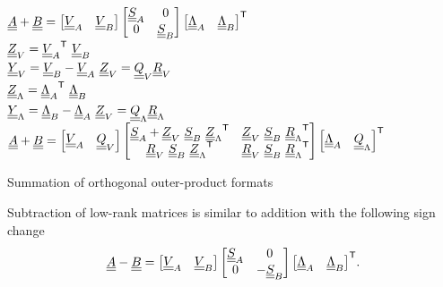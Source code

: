 \begin{algorithm}[hbt!]
	\vspace{0.2cm}
	\vspace{0.2cm}
	$\mA + \mB =
		\begin{bmatrix}
			\mV_A & \mV_B
		\end{bmatrix} \begin{bmatrix}
			\mS_A & 0     \\
			0     & \mS_B
		\end{bmatrix} \T{\begin{bmatrix}
				\mLambda_A & \mLambda_B
			\end{bmatrix}}$\\
	$\mat{Z}_V = \T{\mV_A} \ \mV_B$\\
	$\mat{Y}_V = \mV_B - \mV_A \ \mat{Z}_V = \mQ_V \mR_V$\\
	$\mat{Z}_\Lambda = \T{\mLambda_A} \ \mLambda_B$\\
	$\mat{Y}_\Lambda = \mLambda_B - \mLambda_A \ \mat{Z}_V = \mQ_\Lambda \mR_\Lambda$\\
	$\mA + \mB =\begin{bmatrix}
			\mV_A & \mQ_V
		\end{bmatrix} \begin{bmatrix}
			\mS_A + \mat{Z}_V \ \mS_B \ \T{\mat{Z}_\Lambda} & \mat{Z}_V \ \mS_B \ \T{\mat{R}_\Lambda} \\
			\mR_V \ \mS_B \ \T{\mat{Z}_\Lambda}             & \mR_V \ \mS_B \ \T{\mat{R}_\Lambda}
		\end{bmatrix} \T{\begin{bmatrix}
				\mLambda_A & \mQ_\Lambda
			\end{bmatrix}}$
	\caption{Summation of orthogonal outer-product formats}
	\label{alg:rounded_sum_on_svd}
\end{algorithm}

Subtraction of low-rank matrices is similar to addition with the following sign change
\begin{equation}
	\mA - \mB =
	\begin{bmatrix}
		\mV_A & \mV_B
	\end{bmatrix} \begin{bmatrix}
		\mS_A & 0       \\
		0     & - \mS_B
	\end{bmatrix} \T{\begin{bmatrix}
			\mLambda_A & \mLambda_B
		\end{bmatrix}}.
\end{equation}

